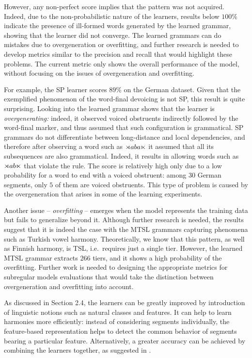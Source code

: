 However, any non-perfect score implies that the pattern was not acquired.
Indeed, due to the non-probabilistic nature of the learners, results below $100$\% indicate the presence of ill-formed words generated by the learned grammar, showing that the learner did not converge.
The learned grammars can do mistakes due to overgeneration or overfitting, and further research is needed to develop metrics similar to the precision and recall that would highlight these problems.
The current metric only shows the overall performance of the model, without focusing on the issues of overgeneration and overfitting.

For example, the SP learner scores $89$\% on the German dataset. 
Given that the exemplified phenomenon of the word-final devoicing is not SP, this result is quite surprising.
Looking into the learned grammar shows that the learner is \emph{overgenerating:} indeed, it observed voiced obstruents indirectly followed by the word-final marker, and thus assumed that such configuration is grammatical. 
SP grammars do not differentiate between long-distance and local dependencies, and therefore after observing a word such as $\rtimes aba\ltimes$ it assumed that all its subsequences are also grammatical.
Indeed, it results in allowing words such as $\rtimes ab\ltimes$ that violate the rule.
The score is relatively high only due to a low probability for a word to end with a voiced obstruent: among $30$ German segments, only $5$ of them are voiced obstruents.
This type of problem is caused by the overgeneration that arises in some of the learning experiments.

Another issue -- \emph{overfitting} -- emerges when the model represents the training data but fails to generalize beyond it.
Although further research is needed, the results suggest that it is indeed the case with the MTSL grammars capturing phenomena such as Turkish vowel harmony.
Theoretically, we know that this pattern, as well as Finnish harmony, is TSL, i.e.\ requires just a single tier.
However, the learned MTSL grammar extracts $266$ tiers, and it shows a high probability of the overfitting.
Further work is needed to designing the appropriate metrics for subregular models evaluations that would take the distinction between overgeneration and overfitting into account.


As discussed in Section 2.4, the learners can be greatly improved by introduction of linguistic notions such as natural classes and features.
It can help to learn harmonies more efficiently: instead of considering segments individually, the feature-based representation helps to detect the common behavior of segments bearing a particular feature.
Alternatively, a greater accuracy can be achieved by combining the learners together, as suggested in \cite{Heinz10ldp,HeinzIdsardi13}.



